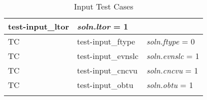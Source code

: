 \documentclass[12pt, titlepage]{article}
\newcounter{utestnum} %
\begin{document}
\begin{longtable}{  l  p{4cm}  p{6cm}  }
	test-input\_ltor &  \textit{soln.ltor} = 1\\ 
	\hline
	TC{utestnum}\theutestnum  \label{TC_InputFtype} & 
	test-input\_ftype &  \textit{soln.ftype} = 0\\ 
	\hline
	TC{utestnum}\theutestnum  \label{TC_InputEvenslc} & 
	test-input\_evnslc &  \textit{soln.evnslc} = 1\\ 
	\hline
	TC{utestnum}\theutestnum  \label{TC_InputCncvu} & 
	test-input\_cncvu &  \textit{soln.cncvu} = 1\\ 
	\hline
	TC{utestnum}\theutestnum  \label{TC_InputObtu} & 
	test-input\_obtu &  \textit{soln.obtu} = 1\\ 
	\hline
	\caption{Input Test Cases}
	\label{InputTests}
\end{longtable}
\end{document}
